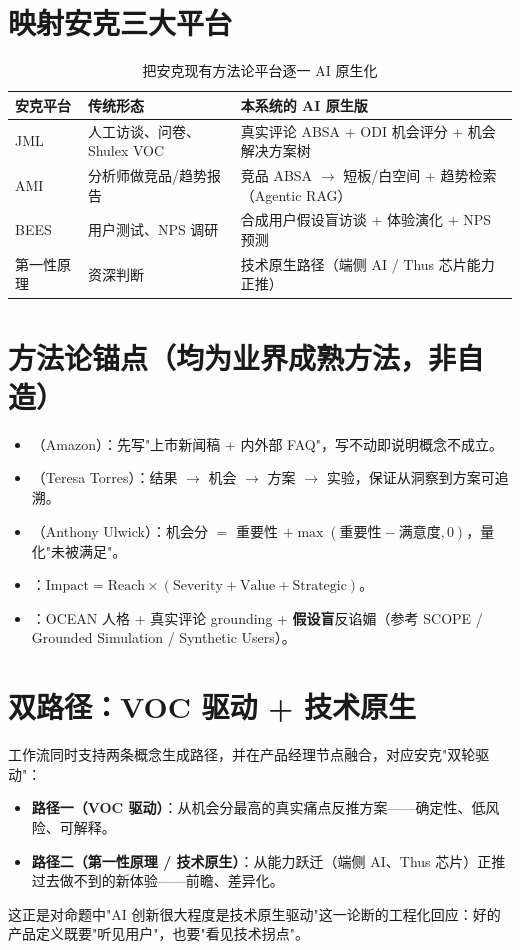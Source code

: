 \section{映射安克三大平台}

\begin{table}[h]\centering\small
\renewcommand{\arraystretch}{1.25}
\begin{tabularx}{\linewidth}{p{2.0cm} p{4.0cm} X}
\toprule
\textbf{安克平台} & \textbf{传统形态} & \textbf{本系统的 AI 原生版} \\
\midrule
JML & 人工访谈、问卷、Shulex VOC & 真实评论 ABSA + ODI 机会评分 + 机会解决方案树 \\
AMI & 分析师做竞品/趋势报告 & 竞品 ABSA $\rightarrow$ 短板/白空间 + 趋势检索（Agentic RAG） \\
BEES & 用户测试、NPS 调研 & 合成用户假设盲访谈 + 体验演化 + NPS 预测 \\
第一性原理 & 资深判断 & 技术原生路径（端侧 AI / Thus 芯片能力正推） \\
\bottomrule
\end{tabularx}
\caption{把安克现有方法论平台逐一 AI 原生化}
\end{table}

\section{方法论锚点（均为业界成熟方法，非自造）}

\begin{itemize}
\item {}（Amazon）：先写"上市新闻稿 + 内外部 FAQ"，写不动即说明概念不成立。
\item {}（Teresa Torres）：结果 $\rightarrow$ 机会 $\rightarrow$ 方案 $\rightarrow$ 实验，保证从洞察到方案可追溯。
\item {}（Anthony Ulwick）：机会分 $=$ 重要性 $+\max(\text{重要性}-\text{满意度},0)$，量化"未被满足"。
\item {}：$\text{Impact}=\text{Reach}\times(\text{Severity}+\text{Value}+\text{Strategic})$。
\item {}：OCEAN 人格 + 真实评论 grounding + \textbf{假设盲}反谄媚（参考 SCOPE / Grounded Simulation / Synthetic Users）。
\end{itemize}

\section{双路径：VOC 驱动 + 技术原生}

工作流同时支持两条概念生成路径，并在产品经理节点融合，对应安克"双轮驱动"：

\begin{itemize}
\item \textbf{路径一（VOC 驱动）}：从机会分最高的真实痛点反推方案——确定性、低风险、可解释。
\item \textbf{路径二（第一性原理 / 技术原生）}：从能力跃迁（端侧 AI、Thus 芯片）正推过去做不到的新体验——前瞻、差异化。
\end{itemize}

这正是对命题中"AI 创新很大程度是技术原生驱动"这一论断的工程化回应：好的产品定义既要"听见用户"，也要"看见技术拐点"。
